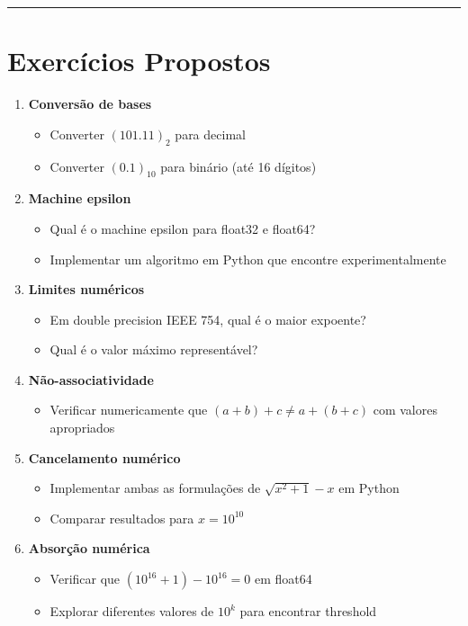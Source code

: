 \documentclass[
  11pt,
  letterpaper,
  DIV=11,
  numbers=noendperiod]{scrartcl}
\providecommand{\tightlist}{%
  \setlength{\itemsep}{0pt}\setlength{\parskip}{0pt}}
\begin{document}
\begin{center}\rule{0.5\linewidth}{0.5pt}\end{center}

\section{Exercícios Propostos}\label{exercuxedcios-propostos}

\begin{enumerate}
\def\labelenumi{\arabic{enumi}.}
\tightlist
\item
  \textbf{Conversão de bases}

  \begin{itemize}
  \tightlist
  \item
    Converter \((101.11)_2\) para decimal
  \item
    Converter \((0.1)_{10}\) para binário (até 16 dígitos)
  \end{itemize}
\item
  \textbf{Machine epsilon}

  \begin{itemize}
  \tightlist
  \item
    Qual é o machine epsilon para float32 e float64?
  \item
    Implementar um algoritmo em Python que encontre experimentalmente
  \end{itemize}
\item
  \textbf{Limites numéricos}

  \begin{itemize}
  \tightlist
  \item
    Em double precision IEEE 754, qual é o maior expoente?
  \item
    Qual é o valor máximo representável?
  \end{itemize}
\item
  \textbf{Não-associatividade}

  \begin{itemize}
  \tightlist
  \item
    Verificar numericamente que \((a + b) + c \neq a + (b + c)\) com
    valores apropriados
  \end{itemize}
\item
  \textbf{Cancelamento numérico}

  \begin{itemize}
  \tightlist
  \item
    Implementar ambas as formulações de \(\sqrt{x^2 + 1} - x\) em Python
  \item
    Comparar resultados para \(x = 10^{10}\)
  \end{itemize}
\item
  \textbf{Absorção numérica}

  \begin{itemize}
  \tightlist
  \item
    Verificar que \((10^{16} + 1) - 10^{16} = 0\) em float64
  \item
    Explorar diferentes valores de \(10^k\) para encontrar threshold
  \end{itemize}
\end{enumerate}
\end{document}
